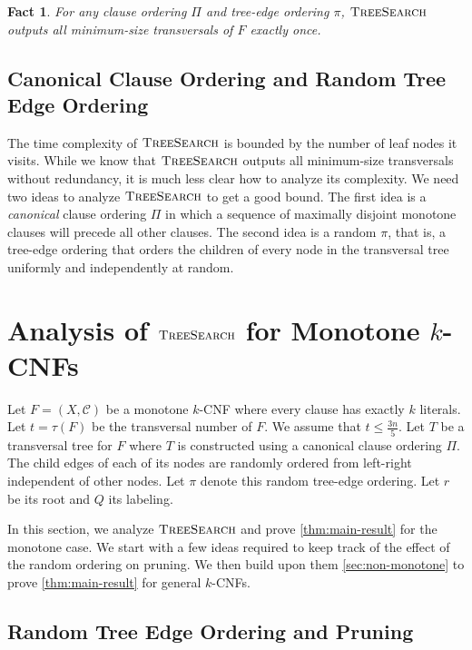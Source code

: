 \documentclass[10pt,a4paper]{article}
\newtheorem{fact}{Fact}
\newcommand{\cC}{\mathcal{C}}
\newcommand{\trn}{\tau}
\newcommand{\ts}{\textsc{TreeSearch}}
\begin{document}
\begin{fact}
For any clause ordering $\Pi$
and tree-edge ordering $\pi$, 
$\ts$ outputs all minimum-size transversals of $F$ exactly once.
\end{fact}

\noindent
\subsection{Canonical Clause Ordering and Random Tree Edge Ordering}

The time complexity of $\ts$ is bounded by the number of leaf nodes it visits.
While we know that $\ts$ outputs 
all minimum-size transversals without redundancy, 
it is much less clear how to analyze its complexity.
We need two ideas to analyze $\ts$ to get a good bound.
The first idea is a \emph{canonical} clause ordering  $\Pi$
in which a sequence of  maximally disjoint
monotone clauses will precede all other clauses.
The second idea is a random $\pi$, that is, 
a tree-edge ordering that orders 
the children of every node in the transversal tree
uniformly 
and independently at random.


\section{Analysis of $\ts$ for Monotone $k$-CNFs} \label{sec:monotone}

Let $F=(X,\cC)$ be a monotone $k$-CNF where every clause has exactly $k$ literals.
Let $t=\trn(F)$ be the transversal number of $F$. We assume 
that $t\leq \frac{3n}{5}$.
Let $T$ be a transversal tree for $F$ where
$T$ is constructed using a canonical clause ordering $\Pi$.
The child edges of each of its nodes are randomly ordered from left-right independent of other nodes. Let $\pi$ denote this random tree-edge ordering. Let $r$ be its root and $Q$ its labeling.

In this section, we analyze 
$\ts$  
and prove \cref{thm:main-result} for 
the monotone case. We start
with a few ideas required to keep track of the effect of the random ordering on pruning.
We then build upon them 
\cref{sec:non-monotone} to prove \cref{thm:main-result} for general $k$-CNFs.

\subsection{Random Tree Edge Ordering and Pruning}
\end{document}
